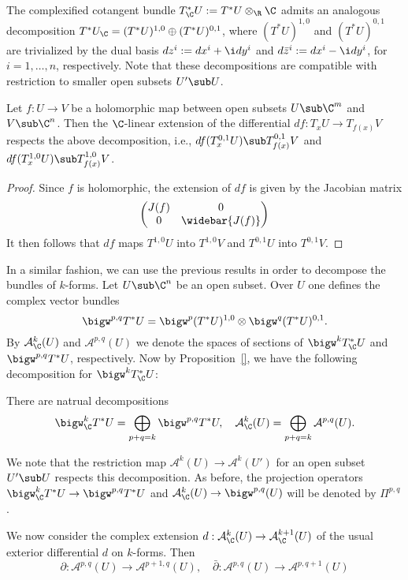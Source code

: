 The complexified cotangent bundle $T^*_{\C}U:=T^*U\otimes_{\R}\C$ admits an analogous decomposition $T^*U_{\C}=(T^*U)^{1,0}\oplus(T^*U)^{0,1}$, where $(T^*U)^{1,0}$ and $(T^*U)^{0,1}$ are trivialized by the dual basis $dz^i:=dx^i+\i dy^i$ and $d\bar{z}^i:=dx^i-\i dy^i$, for $i=1,\dots,n$, respectively. Note that these decompositions are compatible with restriction to smaller open subsets $U'\sub U$.
\begin{proposition}
Let $f:U\to V$ be a holomorphic map between open subsets $U\sub\C^m$ and $V\sub\C^n$. Then the $\C$-linear extension of the differential $df:T_xU\to T_{f(x)}V$ respects the above decomposition, i.e., $df(T_x^{0,1}U)\sub T^{0,1}_{f(x)}V$ and $df(T_x^{1,0}U)\sub T^{1,0}_{f(x)}V$.
\end{proposition}
\begin{proof}
Since $f$ is holomorphic, the extension of $df$ is given by the Jacobian matrix
\[\begin{pmatrix}
J(f)&0\\
0&\widebar{J(f)}
\end{pmatrix}\]
It then follows that $df$ maps $T^{1,0}U$ into $T^{1,0}V$ and $T^{0,1}U$ into $T^{0,1}V$.
\end{proof}
In a similar fashion, we can use the previous results in order to decompose the bundles of $k$-forms. Let $U\sub\C^n$ be an open subset. Over $U$ one defines the complex vector bundles
\[\bigw^{p,q}T^*U=\bigw^p(T^*U)^{1,0}\otimes\bigw^q(T^*U)^{0,1}.\]
By $\mathcal{A}^k_{\C}(U)$ and $\mathcal{A}^{p,q}(U)$ we denote the spaces of sections of $\bigw^kT^*_{\C}U$ and $\bigw^{p,q}T^*U$, respectively. Now by Proposition~\ref{}, we have the following decomposition for $\bigw^kT^*_{\C}U$:
\begin{proposition}
There are natrual decompositions
\[\bigw^k_{\C}T^*U=\bigoplus_{p+q=k}\bigw^{p,q}T^*U,\quad \mathcal{A}_{\C}^k(U)=\bigoplus_{p+q=k}\mathcal{A}^{p,q}(U).\]
\end{proposition}
We note that the restriction map $\mathcal{A}^k(U)\to\mathcal{A}^{k}(U')$ for an open subset $U'\sub U$ respects this decomposition. As before, the projection operators $\bigw^k_{\C}T^*U\to\bigw^{p,q}T^*U$ and $\mathcal{A}^k_{\C}(U)\to\bigw^{p,q}(U)$ will be denoted by $\Pi^{p,q}$.\par
We now consider the complex extension $d:\mathcal{A}^k_{\C}(U)\to\mathcal{A}^{k+1}_{\C}(U)$ of the usual exterior differential $d$ on $k$-forms. Then
\[\partial:\mathcal{A}^{p,q}(U)\to\mathcal{A}^{p+1,q}(U),\quad\bar{\partial}:\mathcal{A}^{p,q}(U)\to\mathcal{A}^{p,q+1}(U)\]
